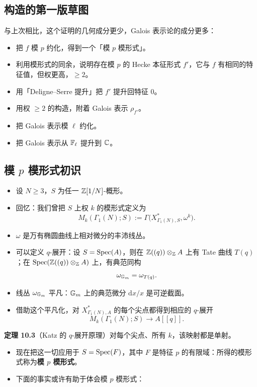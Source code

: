 \subsection*{构造的第一版草图}

与上次相比，这个证明的几何成分更少，Galois 表示论的成分更多：

\begin{itemize}
\item 把 $f$ 模 $p$ 约化，得到一个「模 $p$ 模形式」。
\item 利用模形式的同余，说明存在模 $p$ 的 Hecke 本征形式 $f'$，它与 $f$ 有相同的特征值，但权更高，$\ge 2$。
\item 用「Deligne--Serre 提升」把 $f'$ 提升回特征 $0$。
\item 用权 $\ge 2$ 的构造，附着 Galois 表示 $\rho_{f'}$。
\item 把 Galois 表示模 $\ell$ 约化。
\item 把 Galois 表示从 $\mathbb{F}_\ell$ 提升到 $\mathbb{C}$。
\end{itemize}
\subsection*{模 $p$ 模形式初识}

\begin{itemize}
\item 设 $N\ge 3$，$S$ 为任一 $\mathbb{Z}[1/N]$-概形。
\item 回忆：我们曾把 $S$ 上权 $k$ 的模形式定义为
\[
M_k(\Gamma_1(N);S):=\Gamma\bigl(X^{*}_{\Gamma_1(N),S},\omega^k\bigr).
\]
\item $\omega$ 是万有椭圆曲线上相对微分的丰沛线丛。
\item 可以定义 $q$-展开：设 $S=\operatorname{Spec}(A)$，则在 $\mathbb{Z}((q))\otimes_{\mathbb{Z}} A$ 上有 Tate 曲线 $T(q)$；在 $\operatorname{Spec}(\mathbb{Z}((q))\otimes_{\mathbb{Z}} A)$ 上，有典范同构
\[
\omega_{\mathbb{G}_m}=\omega_{T(q)}.
\]
\item 线丛 $\omega_{\mathbb{G}_m}$ 平凡：$\mathbb{G}_m$ 上的典范微分 $\mathrm{d}x/x$ 是可逆截面。
\item 借助这个平凡化，对 $X^{*}_{\Gamma_1(N),A}$ 的每个尖点都得到相应的 $q$-展开
\[
M_k(\Gamma_1(N);S)\longrightarrow A[[q]].
\]
\end{itemize}

\noindent\textbf{定理 10.3}（Katz 的 $q$-展开原理）\label{thm:10.3}\quad 对每个尖点、所有 $k$，该映射都是单射。

\begin{itemize}
\item 现在把这一切应用于 $S=\operatorname{Spec}(F)$，其中 $F$ 是特征 $p$ 的有限域：所得的模形式称为\textbf{模 $p$ 模形式}。
\item 下面的事实或许有助于体会模 $p$ 模形式：
\end{itemize}


